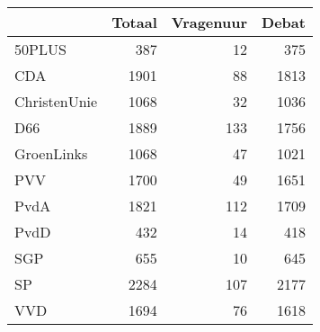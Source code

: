 \begin{tabular}{lrrr}
\toprule
{} &  Totaal &  Vragenuur &  Debat \\
\midrule
50PLUS       &     387 &         12 &    375 \\
CDA          &    1901 &         88 &   1813 \\
ChristenUnie &    1068 &         32 &   1036 \\
D66          &    1889 &        133 &   1756 \\
GroenLinks   &    1068 &         47 &   1021 \\
PVV          &    1700 &         49 &   1651 \\
PvdA         &    1821 &        112 &   1709 \\
PvdD         &     432 &         14 &    418 \\
SGP          &     655 &         10 &    645 \\
SP           &    2284 &        107 &   2177 \\
VVD          &    1694 &         76 &   1618 \\
\bottomrule
\end{tabular}
